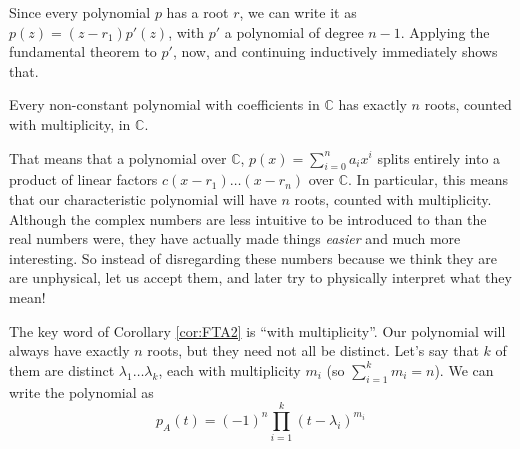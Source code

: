 \begin{appendices}
	 Since every polynomial $p$ has a root $r$, we can write it as $p(z) = (z-r_1) p'(z)$, with $p'$ a polynomial of degree $n-1$.
	 Applying the fundamental theorem to $p'$, now, and continuing inductively immediately shows that.
	 \begin{cor}\label{cor:FTA2}
	 	Every non-constant polynomial with coefficients in $\mathbb{C}$ has exactly $n$ roots, counted with multiplicity, in $\mathbb C$. 
	 \end{cor}
	 That means that a polynomial over $\mathbb C$, $p(x) = \sum_{i = 0}^n a_i x^i$ splits entirely into a product of linear factors $c (x-r_1) \dots (x-r_n)$ over $\mathbb C$. In particular, this means that our characteristic polynomial will have $n$ roots, counted with multiplicity. Although the complex numbers are less intuitive to be introduced to than the real numbers were, they have actually made things \emph{easier} and much more interesting. So instead of disregarding these numbers because we think they are are unphysical, let us accept them, and later try to physically interpret what they mean!
	 
	 
	The key word of Corollary \ref{cor:FTA2} is ``with multiplicity''. Our polynomial will always have exactly $n$ roots, but they need not all be distinct. Let's say that $k$ of them are distinct $\lambda_1 \dots \lambda_k$, each with multiplicity $m_i$ (so $\sum_{i=1}^k m_i = n$). We can write the polynomial as
	\begin{equation}
		p_A(t)  = (-1)^n \prod_{i=1}^k (t - \lambda_i)^{m_i}
	\end{equation}
	

\end{appendices}
